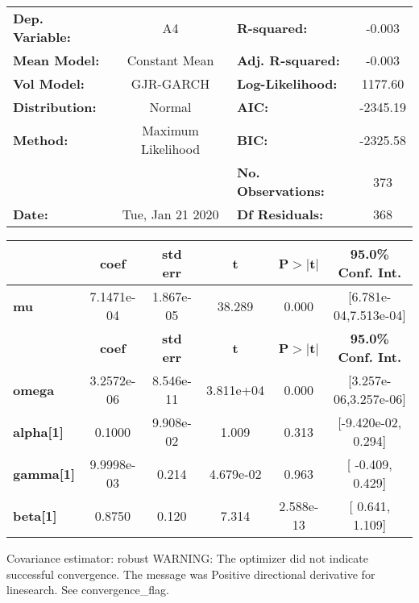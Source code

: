 \begin{center}
\begin{tabular}{lclc}
\toprule
\textbf{Dep. Variable:} &         A4         & \textbf{  R-squared:         } &    -0.003   \\
\textbf{Mean Model:}    &   Constant Mean    & \textbf{  Adj. R-squared:    } &    -0.003   \\
\textbf{Vol Model:}     &     GJR-GARCH      & \textbf{  Log-Likelihood:    } &    1177.60  \\
\textbf{Distribution:}  &       Normal       & \textbf{  AIC:               } &   -2345.19  \\
\textbf{Method:}        & Maximum Likelihood & \textbf{  BIC:               } &   -2325.58  \\
\textbf{}               &                    & \textbf{  No. Observations:  } &    373      \\
\textbf{Date:}          &  Tue, Jan 21 2020  & \textbf{  Df Residuals:      } &    368      \\
\bottomrule
\end{tabular}
\begin{tabular}{lccccc}
            & \textbf{coef} & \textbf{std err} & \textbf{t} & \textbf{P$>$$|$t$|$} & \textbf{95.0\% Conf. Int.}  \\
\midrule
\textbf{mu} &   7.1471e-04  &    1.867e-05     &    38.289  &        0.000         &   [6.781e-04,7.513e-04]     \\
                  & \textbf{coef} & \textbf{std err} & \textbf{t} & \textbf{P$>$$|$t$|$} & \textbf{95.0\% Conf. Int.}  \\
\midrule
\textbf{omega}    &   3.2572e-06  &    8.546e-11     & 3.811e+04  &        0.000         &   [3.257e-06,3.257e-06]     \\
\textbf{alpha[1]} &       0.1000  &    9.908e-02     &     1.009  &          0.313       &    [-9.420e-02,  0.294]     \\
\textbf{gamma[1]} &   9.9998e-03  &        0.214     & 4.679e-02  &          0.963       &     [ -0.409,  0.429]       \\
\textbf{beta[1]}  &       0.8750  &        0.120     &     7.314  &      2.588e-13       &     [  0.641,  1.109]       \\
\bottomrule
\end{tabular}
\end{center}

Covariance estimator: robust \newline
  \newline
 WARNING: The optimizer did not indicate successful convergence. The message was \newline
 Positive directional derivative for linesearch. See convergence_flag.